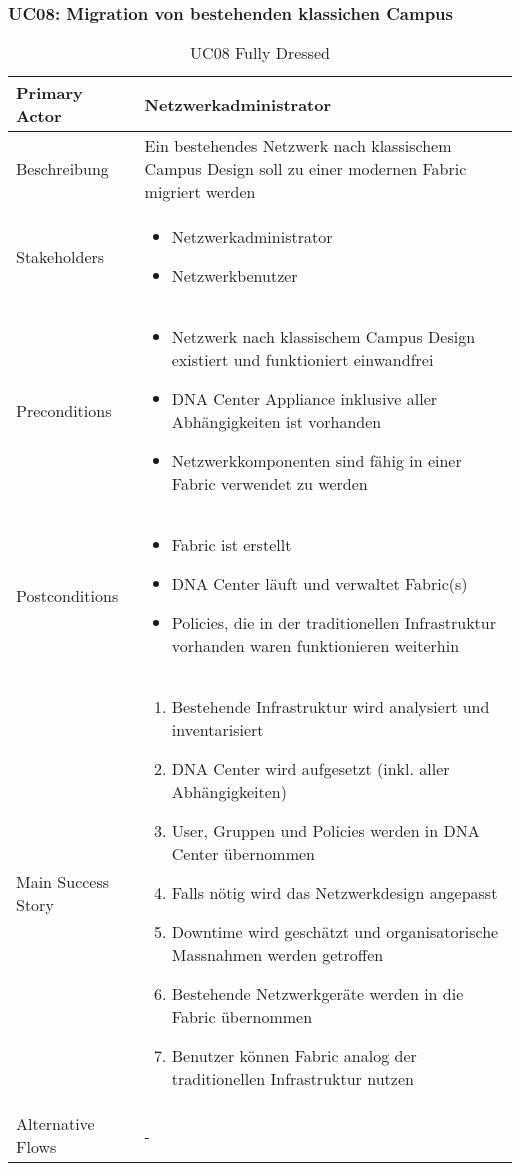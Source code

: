 \subsubsection{UC08: Migration von bestehenden klassichen Campus}
\begin{table}[H]
	\centering
	\begin{tabularx}{\textwidth}{l | X}
		Primary Actor   & Netzwerkadministrator       \\
		\hline
		Beschreibung   & Ein bestehendes Netzwerk nach klassischem Campus Design soll zu einer modernen Fabric migriert werden  \\ 
		\hline
		Stakeholders       & 
		\begin{itemize}
			\item Netzwerkadministrator
			\item Netzwerkbenutzer
		\end{itemize} \\ 
		Preconditions      &
		\begin{itemize}	
			\item Netzwerk nach klassischem Campus Design existiert und funktioniert einwandfrei
			\item DNA Center Appliance inklusive aller Abhängigkeiten ist vorhanden
			\item Netzwerkkomponenten sind fähig in einer Fabric verwendet zu werden
		\end{itemize}  \\
		\hline
		Postconditions     & 
		\begin{itemize}	
			\item Fabric ist erstellt
			\item DNA Center läuft und verwaltet Fabric(s)
			\item Policies, die in der traditionellen Infrastruktur vorhanden waren funktionieren weiterhin
		\end{itemize}  \\
		\hline
		Main Success Story & 
		\begin{enumerate}
			\item Bestehende Infrastruktur wird analysiert und inventarisiert
			\item DNA Center wird aufgesetzt (inkl. aller Abhängigkeiten)
			\item User, Gruppen und Policies werden in DNA Center übernommen
			\item Falls nötig wird das Netzwerkdesign angepasst
			\item Downtime wird geschätzt und organisatorische Massnahmen werden getroffen
			\item Bestehende Netzwerkgeräte werden in die Fabric übernommen
			\item Benutzer können Fabric analog der traditionellen Infrastruktur nutzen
		\end{enumerate}
		\\
		\hline
		Alternative Flows  & -
	\end{tabularx}
	\caption{UC08 Fully Dressed}
	\label{tab:UC08}
\end{table}

